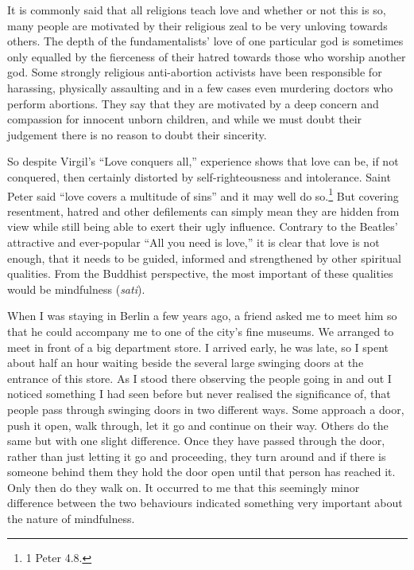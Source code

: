 \documentclass[10pt, openright]{book}
\begin{document}
It is commonly said that all religions teach love and whether or not this is so, many people are motivated by their religious zeal to be very unloving towards others. The depth of the fundamentalists’ love of one particular god is sometimes only equalled by the fierceness of their hatred towards those who worship another god. Some strongly religious anti-abortion activists have been responsible for harassing, physically assaulting and in a few cases even murdering doctors who perform abortions. They say that they are motivated by a deep concern and compassion for innocent unborn children, and while we must doubt their judgement there is no reason to doubt their sincerity.


So despite Virgil’s “Love conquers all,” experience shows that love can be, if not conquered, then certainly distorted by self-righteousness and intolerance. Saint Peter said “love covers a multitude of sins” and it may well do so.\footnote {1 Peter 4.8.} But covering resentment, hatred and other defilements can simply mean they are hidden from view while still being able to exert their ugly influence. Contrary to the Beatles’ attractive and ever-popular “All you need is love,” it is clear that love is not enough, that it needs to be guided, informed and strengthened by other spiritual qualities. From the Buddhist perspective, the most important of these qualities would be mindfulness (\textit{sati}).


When I was staying in Berlin a few years ago, a friend asked me to meet him so that he could accompany me to one of the city’s fine museums. We arranged to meet in front of a big department store. I arrived early, he was late, so I spent about half an hour waiting beside the several large swinging doors at the entrance of this store. As I stood there observing the people going in and out I noticed something I had seen before but never realised the significance of, that people pass through swinging doors in two different ways. Some approach a door, push it open, walk through, let it go and continue on their way. Others do the same but with one slight difference. Once they have passed through the door, rather than just letting it go and proceeding, they turn around and if there is someone behind them they hold the door open until that person has reached it. Only then do they walk on. It occurred to me that this seemingly minor difference between the two behaviours indicated something very important about the nature of mindfulness.
\end{document}
